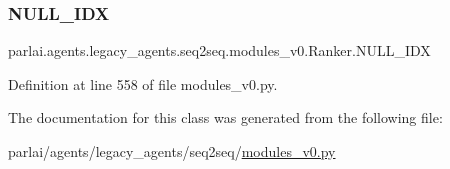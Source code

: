 \subsubsection{\texorpdfstring{N\+U\+L\+L\+\_\+\+I\+DX}{NULL\_IDX}}
{\footnotesize\ttfamily parlai.\+agents.\+legacy\+\_\+agents.\+seq2seq.\+modules\+\_\+v0.\+Ranker.\+N\+U\+L\+L\+\_\+\+I\+DX}



Definition at line 558 of file modules\+\_\+v0.\+py.



The documentation for this class was generated from the following file\+:\begin{DoxyCompactItemize}
\item 
parlai/agents/legacy\+\_\+agents/seq2seq/\hyperlink{seq2seq_2modules__v0_8py}{modules\+\_\+v0.\+py}\end{DoxyCompactItemize}
